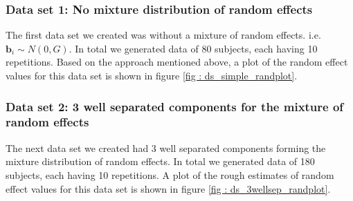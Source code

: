 \subsubsection{Data set 1: No mixture distribution of random effects}
\label{subsubsec : ds_simple}
The first data set we created was without a mixture of random effects. i.e. $\boldsymbol{b}_i \sim N(0, G)$. In total we generated data of 80 subjects, each having 10 repetitions. Based on the approach mentioned above, a plot of the random effect values for this data set is shown in figure \ref{fig : ds_simple_randplot}.

\subsubsection{Data set 2: 3 well separated components for the mixture of random effects}
\label{subsubsec : ds_3wellsep}
The next data set we created had 3 well separated components forming the mixture distribution of random effects. In total we generated data of 180 subjects, each having 10 repetitions. A plot of the rough estimates of random effect values for this data set is shown in figure \ref{fig : ds_3wellsep_randplot}.

